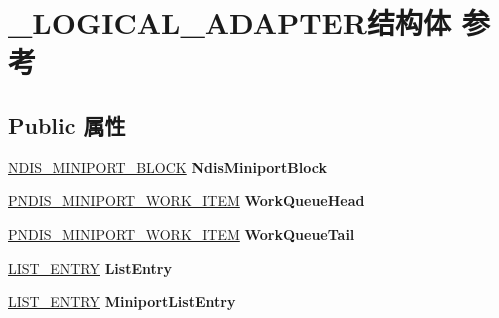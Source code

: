 \hypertarget{struct___l_o_g_i_c_a_l___a_d_a_p_t_e_r}{}\section{\+\_\+\+L\+O\+G\+I\+C\+A\+L\+\_\+\+A\+D\+A\+P\+T\+E\+R结构体 参考}
\label{struct___l_o_g_i_c_a_l___a_d_a_p_t_e_r}
\subsection*{Public 属性}
\begin{DoxyCompactItemize}
\item 
\mbox{\label{struct___l_o_g_i_c_a_l___a_d_a_p_t_e_r_a8fea6d74c405364241d24706762fcc0a}} 
\hyperlink{struct___n_d_i_s___m_i_n_i_p_o_r_t___b_l_o_c_k}{N\+D\+I\+S\+\_\+\+M\+I\+N\+I\+P\+O\+R\+T\+\_\+\+B\+L\+O\+CK} {\bfseries Ndis\+Miniport\+Block}
\item 
\mbox{\label{struct___l_o_g_i_c_a_l___a_d_a_p_t_e_r_a8c80859c5d1884500ae87cdd022b0b51}} 
\hyperlink{struct___n_d_i_s___m_i_n_i_p_o_r_t___w_o_r_k___i_t_e_m}{P\+N\+D\+I\+S\+\_\+\+M\+I\+N\+I\+P\+O\+R\+T\+\_\+\+W\+O\+R\+K\+\_\+\+I\+T\+EM} {\bfseries Work\+Queue\+Head}
\item 
\mbox{\label{struct___l_o_g_i_c_a_l___a_d_a_p_t_e_r_a0667ae9d21ea3749f3cfd44447e2bc03}} 
\hyperlink{struct___n_d_i_s___m_i_n_i_p_o_r_t___w_o_r_k___i_t_e_m}{P\+N\+D\+I\+S\+\_\+\+M\+I\+N\+I\+P\+O\+R\+T\+\_\+\+W\+O\+R\+K\+\_\+\+I\+T\+EM} {\bfseries Work\+Queue\+Tail}
\item 
\mbox{\label{struct___l_o_g_i_c_a_l___a_d_a_p_t_e_r_a5be9226a350ad84053fe8c2591a392cd}} 
\hyperlink{struct___l_i_s_t___e_n_t_r_y}{L\+I\+S\+T\+\_\+\+E\+N\+T\+RY} {\bfseries List\+Entry}
\item 
\mbox{\label{struct___l_o_g_i_c_a_l___a_d_a_p_t_e_r_ad9a642449c834ca147bf9ff092f25ed0}} 
\hyperlink{struct___l_i_s_t___e_n_t_r_y}{L\+I\+S\+T\+\_\+\+E\+N\+T\+RY} {\bfseries Miniport\+List\+Entry}
\item 
\mbox{\label{struct___l_o_g_i_c_a_l___a_d_a_p_t_e_r_a86ee2b33a96c1f8126388c9a31ba75dc}} 

\end{DoxyCompactItemize}
